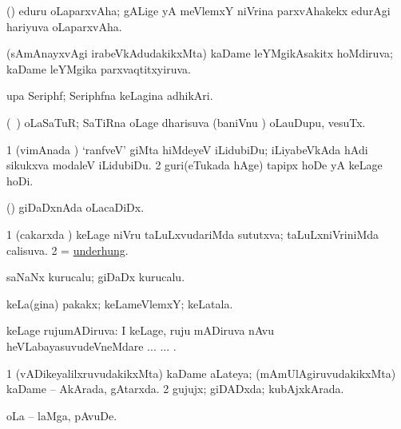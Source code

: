 \bentry
{} 
\gl{\nA}
\expl{}
\bmng
 (\nw) eduru oLaparxvAha; gALige yA meVlemxY niVrina parxvAhakekx edurAgi hariyuva oLaparxvAha. 
\emng
\eentry

\bentry
{} 
\gl{\gu}
\expl{}
\bmng
(sAmAnayxvAgi irabeVkAdudakikxMta) kaDame leYMgikAsakitx hoMdiruva; kaDame leYMgika parxvaqtitxyiruva. 
\emng
\eentry

\bentry
{} 
\gl{\nA}
\expl{}
\bmng
 upa Seriphf; Seriphfna keLagina adhikAri. 
\emng
\eentry

\bentry
{} 
\gl{\gu}
\expl{}
\bmng
 (\kanmu\ \ame) oLaSaTuR; SaTiRna oLage dharisuva (baniVnu \mo) oLauDupu, vesuTx. 
\emng
\eentry

\bentry
{} 
\gl{\sakirx}
\expl{}
\bmng
\bnum
\num{1} (vimAnada \vi) `ranfveV' giMta hiMdeyeV iLidubiDu; iLiyabeVkAda hAdi sikukxva modaleV iLidubiDu. 
\num{2} guri(eTukada hAge) tapipx hoDe yA keLage hoDi. 
\enum
\emng
\eentry


\bentry
{} 
\gl{\nA}
\expl{}
\bmng
(\ame) giDaDxnAda oLacaDiDx. 
\emng
\eentry

\bentry
{} 	
\gl{\gu}
\expl{}
\bmng
\bnum
\num{1} (cakarxda \vi) keLage niVru taLuLxvudariMda sututxva; taLuLxniVriniMda calisuva. 
\num{2} = \hyperlink{underhung}{underhung}. 
\enum
\emng
\eentry

\bentry
{} 
\gl{\nA}
\expl{}
\bmng
 saNaNx kurucalu; giDaDx kurucalu. 
\emng
\eentry

\bentry
{} 
\gl{\nA}
\expl{}
\bmng
 keLa(gina) pakakx; keLameVlemxY; keLatala. 
\emng
\eentry

\bentry
{} 
\gl{\gu}
\expl{}
\bmng
 keLage rujumADiruva:  I keLage, ruju mADiruva nAvu heVLabayasuvudeVneMdare ... ... . 
\emng
\eentry

\bentry
{} 
\gl{\gu}
\expl{}
\bmng
\bnum
\num{1} (vADikeyalilxruvudakikxMta) kaDame aLateya; (mAmUlAgiruvudakikxMta) kaDame -- AkArada, gAtarxda. 
\num{2} gujujx; giDADxda; kubAjxkArada. 
\enum
\emng
\eentry

\bentry
{} 
\gl{\nA}
\expl{}
\bmng
 oLa -- laMga, pAvuDe. 
\emng
\eentry

